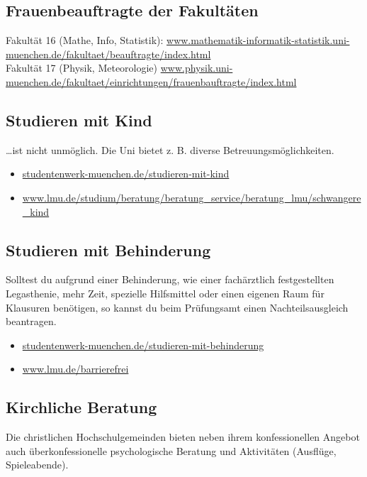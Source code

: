 \subsection{Frauenbeauftragte der Fakultäten}

Fakultät 16 (Mathe, Info, Statistik): \newline
\url{www.mathematik-informatik-statistik.uni-muenchen.de/fakultaet/beauftragte/index.html}\\

Fakultät 17 (Physik, Meteorologie)\newline
\url{www.physik.uni-muenchen.de/fakultaet/einrichtungen/frauenbauftragte/index.html}

\subsection{Studieren mit Kind}

\ldots ist nicht unmöglich. Die Uni bietet z. B. diverse Betreuungsmöglichkeiten.

\begin{itemize}
	\item \url{studentenwerk-muenchen.de/studieren-mit-kind}
	\item \url{www.lmu.de/studium/beratung/beratung_service/beratung_lmu/schwangere_kind}
\end{itemize}

\subsection{Studieren mit Behinderung}

Solltest du aufgrund einer Behinderung, wie einer fachärztlich festgestellten Legasthenie, mehr Zeit, spezielle Hilfsmittel oder einen eigenen Raum für Klausuren benötigen, so kannst du beim Prüfungsamt einen Nachteilsausgleich beantragen.

\begin{itemize}
	\item \url{studentenwerk-muenchen.de/studieren-mit-behinderung}
	\item \url{www.lmu.de/barrierefrei}
\end{itemize}



\subsection{Kirchliche Beratung}
Die christlichen Hochschulgemeinden bieten neben ihrem konfessionellen Angebot auch überkonfessionelle psychologische Beratung und Aktivitäten (Ausflüge, Spieleabende).

